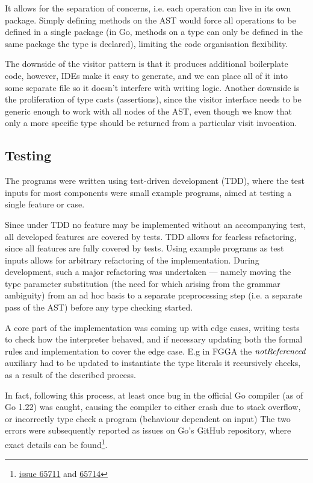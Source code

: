 It allows for the separation of concerns, i.e. each operation can live in its
own package. Simply defining methods on the AST would force all operations to be
defined in a single package (in Go, methods on a type can only be defined in the
same package the type is declared), limiting the code organisation flexibility.

The downside of the visitor pattern is that it produces additional boilerplate
code, however, IDEs make it easy to generate, and we can place all of it into
some separate file so it doesn't interfere with writing logic. Another downside
is the proliferation of type casts (assertions), since the visitor interface
needs to be generic enough to work with all nodes of the AST, even though we
know that only a more specific type should be returned from a particular visit
invocation.

\subsection{Testing}

The programs were written using test-driven development (TDD), where the test
inputs for most components were small example programs, aimed at testing a
single feature or case.

Since under TDD no feature may be implemented without an accompanying test, all
developed features are covered by tests. TDD allows for fearless refactoring,
since all features are fully covered by tests. Using example programs as test
inputs allows for arbitrary refactoring of the implementation. During
development, such a major refactoring was undertaken --- namely moving the type parameter
substitution (the need for which arising from the grammar ambiguity) from an ad
hoc basis to a separate preprocessing step (i.e. a separate pass of the AST)
before any type checking started.

A core part of the implementation was coming up with edge cases, writing tests
to check how the interpreter behaved, and if necessary updating both the formal
rules and implementation to cover the edge case. E.g in FGGA the $\mathit{notReferenced}$
auxiliary had to be updated to instantiate the type literals it recursively
checks, as a result of the described process.

In fact, following this process, at least once bug in the official Go compiler
(as of Go 1.22) was caught, causing the compiler to either crash due to stack
overflow, or incorrectly type check a program (behaviour dependent on input) The
two errors were subsequently reported as issues on Go's GitHub repository, where
exact details can be
found\footnote{\href{https://github.com/golang/go/issues/65711}{issue 65711} and
    \href{https://github.com/golang/go/issues/65714}{65714}}.

